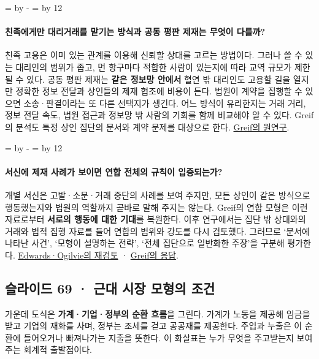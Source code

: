 \documentclass[10pt,a4paper]{article}
\newcommand{\ReserveQuestionSpace}{%
  \par\begingroup
  \dimen0=\pagegoal \advance\dimen0 by -\pagetotal
  \dimen2=\baselineskip \multiply\dimen2 by 12
  \ifdim\dimen0<\dimen2 \newpage\fi
  \endgroup}
\begin{document}
\ReserveQuestionSpace
\paragraph{친족에게만 대리거래를 맡기는 방식과 공동 평판 제재는 무엇이 다를까?}

친족 고용은 이미 있는 관계를 이용해 신뢰할 상대를 고르는 방법이다. 그러나 쓸 수 있는 대리인의 범위가 좁고, 먼 항구마다 적합한 사람이 있는지에 따라 교역 규모가 제한될 수 있다. 공동 평판 제재는 \textbf{같은 정보망 안에서} 혈연 밖 대리인도 고용할 길을 열지만 정확한 정보 전달과 상인들의 제재 협조에 비용이 든다. 법원이 계약을 집행할 수 있으면 소송·판결이라는 또 다른 선택지가 생긴다. 어느 방식이 유리한지는 거래 거리, 정보 전달 속도, 법원 접근과 정보망 밖 사람의 기회를 함께 비교해야 알 수 있다. Greif의 분석도 특정 상인 집단의 문서와 계약 문제를 대상으로 한다. \href{https://web.stanford.edu/\%7Eavner/Greif\_Papers/1989\%20Greif\%20JEH\%201989.pdf}{Greif의 원연구}.\par

\ReserveQuestionSpace
\paragraph{서신에 제재 사례가 보이면 연합 전체의 규칙이 입증되는가?}

개별 서신은 고발·소문·거래 중단의 사례를 보여 주지만, 모든 상인이 같은 방식으로 행동했는지와 법원의 역할까지 곧바로 말해 주지는 않는다. Greif의 연합 모형은 이런 자료로부터 \textbf{서로의 행동에 대한 기대}를 복원한다. 이후 연구에서는 집단 밖 상대와의 거래와 법적 집행 자료를 들어 연합의 범위와 강도를 다시 검토했다. 그러므로 ‘문서에 나타난 사건’, ‘모형이 설명하는 전략’, ‘전체 집단으로 일반화한 주장’을 구분해 평가한다. \href{https://www.repository.cam.ac.uk/items/afa0f243-87f4-4c7f-9fe7-6234ed3f1682}{Edwards·Ogilvie의 재검토} · \href{https://web.stanford.edu/\%7Eavner/Greif\_Papers/2012\_Greif\_long\_ssrn\_Maghribi.pdf}{Greif의 응답}.\par

\subsection{슬라이드 69 · 근대 시장 모형의 조건}
가운데 도식은 \textbf{가계·기업·정부의 순환 흐름}을 그린다. 가계가 노동을 제공해 임금을 받고 기업의 재화를 사며, 정부는 조세를 걷고 공공재를 제공한다. 주입과 누출은 이 순환에 들어오거나 빠져나가는 지출을 뜻한다. 이 화살표는 누가 무엇을 주고받는지 보여 주는 회계적 출발점이다.\par
\end{document}
